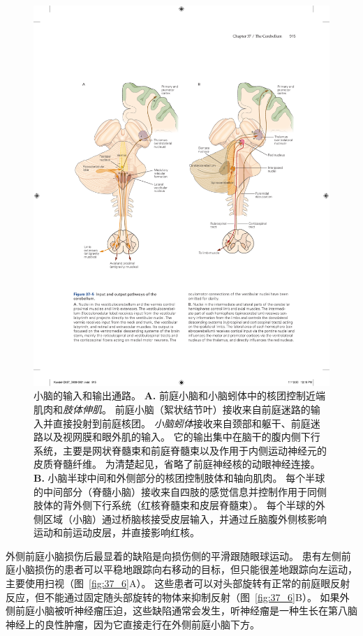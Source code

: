 \begin{figure}[htbp]
	\centering
	\includegraphics[width=1.0\linewidth]{chap37/fig_37_5}
	\caption{小脑的输入和输出通路。
		\textbf{A.} 前庭小脑和小脑蚓体中的核团控制近端肌肉和\textit{肢体伸肌}。
		前庭小脑（絮状结节叶）接收来自前庭迷路的输入并直接投射到前庭核团。
		\textit{小脑蚓体}接收来自颈部和躯干、前庭迷路以及视网膜和眼外肌的输入。
		它的输出集中在脑干的腹内侧下行系统，主要是网状脊髓束和前庭脊髓束以及作用于内侧运动神经元的皮质脊髓纤维。
		为清楚起见，省略了前庭神经核的动眼神经连接。
		\textbf{B.} 小脑半球中间和外侧部分的核团控制肢体和轴向肌肉。
		每个半球的中间部分（脊髓小脑）接收来自四肢的感觉信息并控制作用于同侧肢体的背外侧下行系统（红核脊髓束和皮层脊髓束）。
		每个半球的外侧区域（小脑）通过桥脑核接受皮层输入，并通过丘脑腹外侧核影响运动和前运动皮层，并直接影响红核。}
	\label{fig:37_5}
\end{figure}


外侧前庭小脑损伤后最显着的缺陷是向损伤侧的平滑跟随眼球运动。
患有左侧前庭小脑损伤的患者可以平稳地跟踪向右移动的目标，但只能很差地跟踪向左运动，主要使用扫视（图~\ref{fig:37_6}A）。
这些患者可以对头部旋转有正常的前庭眼反射反应，但不能通过固定随头部旋转的物体来抑制反射（图~\ref{fig:37_6}B）。
如果外侧前庭小脑被听神经瘤压迫，这些缺陷通常会发生，听神经瘤是一种生长在第八脑神经上的良性肿瘤，因为它直接走行在外侧前庭小脑下方。


